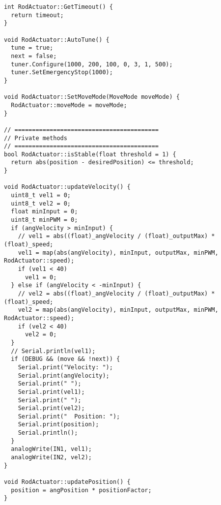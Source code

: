 \begin{verbatim}
int RodActuator::GetTimeout() {
  return timeout;
}

void RodActuator::AutoTune() {
  tune = true;
  next = false;
  tuner.Configure(1000, 200, 100, 0, 3, 1, 500);
  tuner.SetEmergencyStop(1000);
}

void RodActuator::SetMoveMode(MoveMode moveMode) {
  RodActuator::moveMode = moveMode;
}

// =========================================
// Private methods
// =========================================
bool RodActuator::isStable(float threshold = 1) {
  return abs(position - desiredPosition) <= threshold;
}

void RodActuator::updateVelocity() {
  uint8_t vel1 = 0;
  uint8_t vel2 = 0;
  float minInput = 0;
  uint8_t minPWM = 0;
  if (angVelocity > minInput) {
    // vel1 = abs((float)_angVelocity / (float)_outputMax) * (float)_speed;
    vel1 = map(abs(angVelocity), minInput, outputMax, minPWM, RodActuator::speed);
    if (vel1 < 40)
      vel1 = 0;
  } else if (angVelocity < -minInput) {
    // vel2 = abs((float)_angVelocity / (float)_outputMax) * (float)_speed;
    vel2 = map(abs(angVelocity), minInput, outputMax, minPWM, RodActuator::speed);
    if (vel2 < 40)
      vel2 = 0;
  }
  // Serial.println(vel1);
  if (DEBUG && (move && !next)) {
    Serial.print("Velocity: ");
    Serial.print(angVelocity);
    Serial.print(" ");
    Serial.print(vel1);
    Serial.print(" ");
    Serial.print(vel2);
    Serial.print("  Position: ");
    Serial.print(position);
    Serial.println();
  }
  analogWrite(IN1, vel1);
  analogWrite(IN2, vel2);
}

void RodActuator::updatePosition() {
  position = angPosition * positionFactor;
}
\end{verbatim}